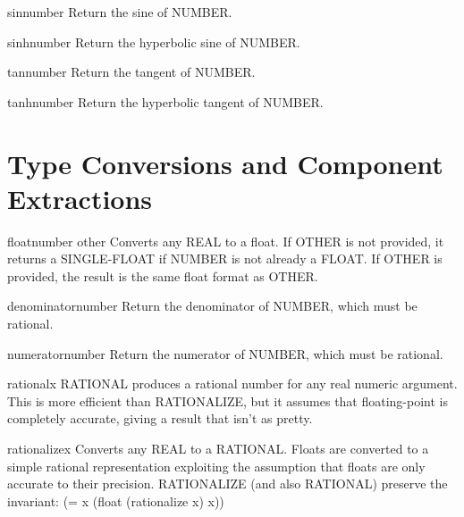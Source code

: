 \begin{function}{sin}{number}{}{}
  Return the sine of NUMBER.
\end{function}

\begin{function}{sinh}{number}{}{}
  Return the hyperbolic sine of NUMBER.
\end{function}

\begin{function}{tan}{number}{}{}
  Return the tangent of NUMBER.
\end{function}

\begin{function}{tanh}{number}{}{}
  Return the hyperbolic tangent of NUMBER.
\end{function}

\section{Type Conversions and Component Extractions}
\label{sec:type-conv-comp}

\begin{function}{float}{number \op other}{}{}
  Converts any REAL to a float. If OTHER is not provided, it returns a
  SINGLE-FLOAT if NUMBER is not already a FLOAT. If OTHER is provided, the
  result is the same float format as OTHER.
\end{function}

\begin{function}{denominator}{number}{}{}
  Return the denominator of NUMBER, which must be rational.
\end{function}

\begin{function}{numerator}{number}{}{}
  Return the numerator of NUMBER, which must be rational.
\end{function}

\begin{function}{rational}{x}{}{}
  RATIONAL produces a rational number for any real numeric argument. This is
  more efficient than RATIONALIZE, but it assumes that floating-point is
  completely accurate, giving a result that isn't as pretty.
\end{function}

\begin{function}{rationalize}{x}{}{}
  Converts any REAL to a RATIONAL.  Floats are converted to a simple rational
  representation exploiting the assumption that floats are only accurate to
  their precision.  RATIONALIZE (and also RATIONAL) preserve the invariant:
      (= x (float (rationalize x) x))
\end{function}

